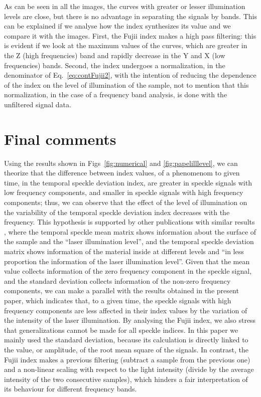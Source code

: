 \documentclass[review]{elsarticle}
\begin{document}
As can be seen in all the images, the curves with greater or lesser  illumination levels are close,
but there is no advantage in separating the signals by bands.
This can be explained if we analyse how the index synthesizes its value and we compare it with the images.
First, the Fujii index makes a high pass filtering:
this is evident if we look at the maximum values of the curves,
which are greater in the Z (high frequencies) band and rapidly decrease in the Y and X (low frequencies) bands.
Second, the index undergoes a normalization, in the denominator of Eq.~\ref{eq:contFujii2},
with the intention of reducing the dependence of the index on the level of illumination of the sample,
not to mention that this normalization, in the case of a frequency band analysis, is done with the unfiltered signal data.

\section{Final comments} 

Using the results shown in Figs~\ref{fig:numerical} and \ref{fig:papelilllevel},
we can theorize that 
the difference between index values, of a phenomenom to given time,
in  the temporal speckle deviation index,
are greater in speckle signals with low frequency components, 
and  smaller in speckle signals with high frequency components;
thus, we can observe that the effect of the level of illumination on 
the variability of the temporal speckle deviation index decreases with the frequency.
This hypothesis is supported by other publications with similar results \cite{Nothdurft:05},
where the temporal speckle mean matrix shows information about the surface of the sample and the ``laser illumination level'', 
and the temporal speckle deviation matrix shows information of the material inside at 
different levels and ``in less proportion the information of the laser illumination level''.
Given that the mean value collects information of the zero frequency component in the speckle signal, 
and the standard deviation  collects information of the non-zero frequency components,
we can make a parallel
with the results obtained in the present paper,
which indicates that, to a given time, the speckle signals with high frequency components
 are less affected in their index values by the variation of the intensity of the laser illumination.
By analysing the Fujii index, 
we also stress that generalizations cannot be made for all speckle indices.
In this paper we mainly used the standard deviation, because its calculation is directly linked to the value, 
or amplitude, of the root mean square of the signals.
In contrast, the Fujii index makes a previous filtering (subtract a sample from the previous one) 
and a non-linear scaling with respect to the light intensity (divide by the average intensity of the two consecutive samples), 
which hinders a fair interpretation of its behaviour for different frequency bands.
\end{document}
